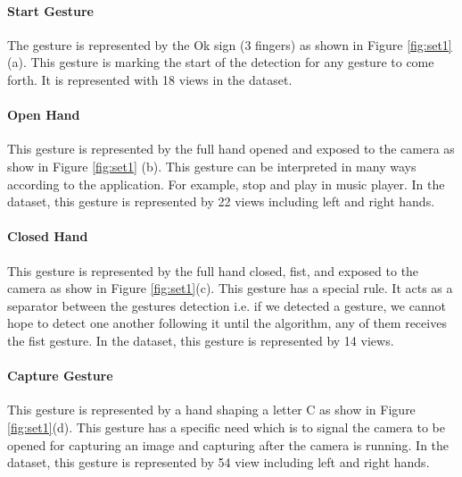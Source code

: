 \documentclass[12pt,fleqn]{book} %
\begin{document}
\paragraph{Start Gesture}
The gesture is represented by the Ok sign (3 fingers) as shown in Figure \ref{fig:set1} (a). This gesture is marking the start of the detection for any gesture to come forth. It is represented with 18 views in the dataset.

\paragraph{Open Hand}
This gesture is represented by the full hand opened and exposed to the camera as show in Figure \ref{fig:set1} (b). This gesture can be interpreted in many ways according to the application. For example, stop and play in music player. In the dataset, this gesture is represented by 22 views including left and right hands.

\paragraph{Closed Hand}
This gesture is represented by the full hand closed, fist, and exposed to the camera as show in Figure \ref{fig:set1}(c). This gesture has a special rule. It acts as a separator between the gestures detection i.e. if we detected a gesture, we cannot hope to detect one another following it until the algorithm, any of them receives the fist gesture. In the dataset, this gesture is represented by 14 views.

\paragraph{Capture Gesture}
This gesture is represented by a hand shaping a letter C as show in Figure \ref{fig:set1}(d). This gesture has a specific need which is to signal the camera to be opened for capturing an image and capturing after the camera is running. In the dataset, this gesture is represented by 54 view including left and right hands. 
\end{document}

